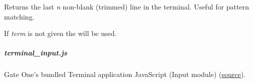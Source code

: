\documentclass[letterpaper,10pt,openany]{sphinxmanual}
\begin{document}

\begin{fulllineitems}
\label{Applications/terminal/js_terminal:GateOne.Terminal.lastLines}
Returns the last \emph{n} non-blank (trimmed) line in the terminal.  Useful for pattern matching.

If \emph{term} is not given the  will be used.

\end{fulllineitems}



\subparagraph{terminal\_input.js}
\label{Applications/terminal/js_terminal_input:terminal-input-javascript}\label{Applications/terminal/js_terminal_input:terminal-input-js}\label{Applications/terminal/js_terminal_input::doc}
Gate One's bundled Terminal application JavaScript (Input module) (\href{https://github.com/liftoff/GateOne/blob/master/gateone/applications/terminal/static/terminal\_input.js}{source}).
\end{document}
